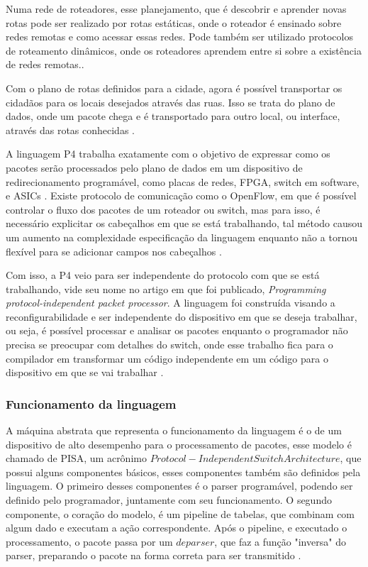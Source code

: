\documentclass[12pt,
openright, 
oneside,
a4paper,
brazil]{facom-ufu-abntex2}
\theoremstyle{definition}
\begin{document}
Numa rede de roteadores, esse planejamento, que é descobrir e aprender novas rotas 
pode ser realizado por rotas estáticas, onde o roteador é ensinado sobre redes remotas
e como acessar essas redes. Pode também ser utilizado protocolos de roteamento dinâmicos,
onde os roteadores aprendem entre si sobre a existência de redes remotas.\citep{dataVsControl}.

Com o plano de rotas definidos para a cidade, agora é possível transportar os cidadãos
para os locais desejados através das ruas. Isso se trata do plano de dados, onde 
um pacote chega e é transportado para outro local, ou interface, através das rotas 
conhecidas \citep{dataVsControl}.

A linguagem P4 trabalha exatamente com o objetivo de expressar como os pacotes serão 
processados pelo plano de dados em um dispositivo de redirecionamento programável, 
como placas de redes, FPGA, switch em software, e ASICs \citep{paxos16spec}. Existe 
protocolo de comunicação como o OpenFlow, em que é possível controlar o fluxo dos 
pacotes de um roteador ou switch, mas para isso, é necessário explicitar os 
cabeçalhos em que se está trabalhando, tal método causou um aumento na complexidade 
especificação da linguagem enquanto não a tornou flexível para se adicionar campos 
nos cabeçalhos \citep{bosshart2014p4}.

Com isso, a P4 veio para ser independente do protocolo com que se está trabalhando,
vide seu nome no artigo em que foi publicado, 
\textit{Programming protocol-independent packet processor}. A linguagem foi 
construída visando a reconfigurabilidade e ser independente do dispositivo em que se 
deseja trabalhar, ou seja, é possível processar e analisar os pacotes enquanto o programador
não precisa se preocupar com detalhes do switch, onde esse trabalho fica para o compilador 
em transformar um código independente em um código para o dispositivo em que se vai 
trabalhar \citep{bosshart2014p4}.

\subsubsection{Funcionamento da linguagem}

A máquina abstrata que representa o funcionamento da linguagem é o de um dispositivo
de alto desempenho para o processamento de pacotes, esse modelo é chamado de PISA,
um acrônimo $Protocol-Independent Switch Architecture$, que possui alguns componentes
básicos, esses componentes também são definidos pela linguagem. O primeiro desses 
componentes é o parser programável, podendo ser definido pelo programador, juntamente 
com seu funcionamento. O segundo componente, o coração do modelo, é um pipeline de tabelas,
que combinam com algum dado e executam a ação correspondente. Após o pipeline, e executado
o processamento, o pacote passa por um $deparser$, que faz a função "inversa" do parser,
preparando o pacote na forma correta para ser transmitido \citep{p4LangTutorial}.
\end{document}
